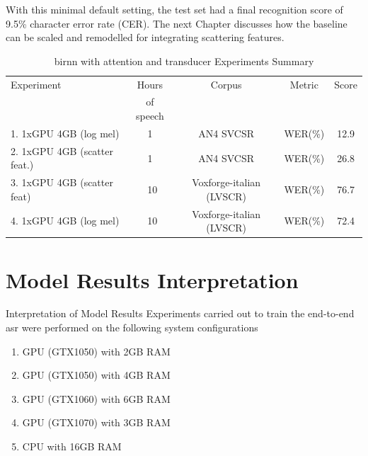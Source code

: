 {With this minimal default setting, the test set had a final recognition score of 9.5\% character error rate (CER).  The next Chapter discusses how the baseline can be scaled and remodelled for integrating scattering features.

\begin{table}
  \caption{\acrshort{birnn} with attention and transducer Experiments Summary}
  \label{tab_c6_04_training}
\begin{tabular}{lcccc}
\toprule
Experiment & Hours & Corpus & Metric & Score\\& of speech\\
\midrule
1. 1xGPU 4GB (log mel) & 1 & AN4 SVCSR & WER(\%) & 12.9\\
2. 1xGPU 4GB (scatter feat.) & 1 & AN4 SVCSR & WER(\%) & 26.8 \\
3. 1xGPU 4GB (scatter feat) & ~10 & Voxforge-italian (LVSCR) & WER(\%) & 76.7 \\
4. 1xGPU 4GB (log mel) & ~10 &  Voxforge-italian (LVSCR) & WER(\%) & 72.4\\
\bottomrule
\end{tabular}
\end{table}

\section{Model Results Interpretation}
Interpretation of Model Results
Experiments carried out to train the end-to-end \acrshort{asr} were performed on the following system configurations
\begin{enumerate}
    \item GPU (GTX1050) with 2GB RAM
    \item GPU (GTX1050) with 4GB RAM
    \item GPU (GTX1060) with 6GB RAM
    \item GPU (GTX1070) with 3GB RAM
    \item CPU with 16GB RAM
\end{enumerate}

}
